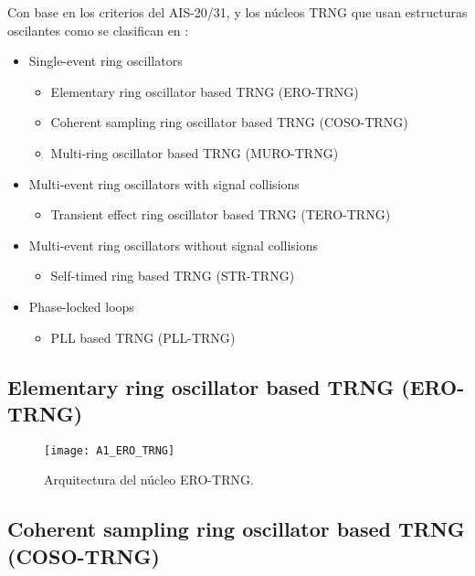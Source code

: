 	Con base en los criterios del AIS-20/31, y los núcleos \gls{TRNG} que usan estructuras oscilantes como se clasifican en \cite{Petura2016}:
	
	\begin{itemize}
		\item Single-event ring oscillators
			\begin{itemize}
				\item Elementary ring oscillator based TRNG (\gls{ERO-TRNG})
				\item Coherent sampling ring oscillator based TRNG (\gls{COSO-TRNG})
				\item Multi-ring oscillator based TRNG (\gls{MURO-TRNG})
			\end{itemize}
		\item Multi-event ring oscillators with signal collisions
			\begin{itemize}
				\item Transient effect ring oscillator based TRNG (\gls{TERO-TRNG})
			\end{itemize}
		\item Multi-event ring oscillators without signal collisions
			\begin{itemize}
				\item Self-timed ring based TRNG (\gls{STR-TRNG})
			\end{itemize}
		\item Phase-locked loops
			\begin{itemize}
				\item PLL based TRNG (\gls{PLL-TRNG})
			\end{itemize}
	\end{itemize}
	
		\subsection{Elementary ring oscillator based TRNG (ERO-TRNG)}
		
					
				\begin{figure}[hbtp]
					\caption{Arquitectura del núcleo ERO-TRNG.}
					\centering
					\texttt{[image: A1\_ERO\_TRNG]}
					\label{fig:A1_ERO_TRNG}
				\end{figure}
			
			
			
		\subsection{Coherent sampling ring oscillator based TRNG (COSO-TRNG)}
	
